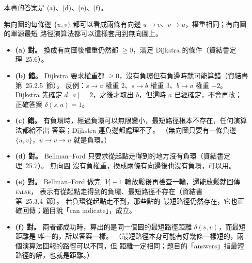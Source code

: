 \begin{pastsoln}
本書的答案是 (a)、(d)、(e)、(f)。

無向圖的每條邊 $\{u, v\}$ 都可以看成兩條有向邊 $u \to v$、$v \to u$，權重相同；有向圖的單源最短
路徑演算法都可以這樣套用到無向圖上。
\begin{itemize}
\item \textbf{(a) 對。} 換成有向圖後權重仍然都 $\ge 0$，滿足 Dijkstra 的條件（資結書定理~25.6）。
\item \textbf{(b) 錯。} Dijkstra 要求權重都 $\ge 0$，沒有負環但有負邊時就可能算錯（資結書
第~25.2.5~節）。 反例：$s \to a$ 權重 $2$、$s \to b$ 權重 $3$、$b \to a$ 權重 $-2$。 Dijkstra 先確定
$d[a] = 2$，之後才取出 $b$，但這時 $a$ 已經確定，不會再改；正確答案 $\delta(s, a) = 1$。
\item \textbf{(c) 錯。} 有負環時，經過負環可以無限變小，最短路徑根本不存在，任何演算法都給不出
答案；Dijkstra 連負邊都處理不了。 （無向圖只要有一條負邊 $\{u, v\}$，$u \to v \to u$ 就是負環。）
\item \textbf{(d) 對。} Bellman--Ford 只要求從起點走得到的地方沒有負環（資結書定理~25.7）。 無向圖
沒有負權重，換成兩條有向邊後也沒有負環，可以用。
\item \textbf{(e) 對。} Bellman--Ford 做完 $|V| - 1$ 輪放鬆後再檢查一輪，還能放鬆就回傳 \textsc{false}，
表示有從起點走得到的負環、最短路徑不存在（資結書第~25.3.4~節）。 若負環從起點走不到，那些點的
最短路徑仍然存在，它也正確回傳；題目說「can indicate」，成立。
\item \textbf{(f) 對。} 兩者都成功時，算出的是同一個圖的最短路徑距離 $\delta(s, v)$，而最短距離是
唯一的，所以答案一樣。 （最短路徑本身可能有好幾條一樣短的，兩個演算法回報的路徑可以不同，但
距離一定相同；題目的「answers」指最短路徑的解，也就是距離。）
\end{itemize}
\end{pastsoln}
